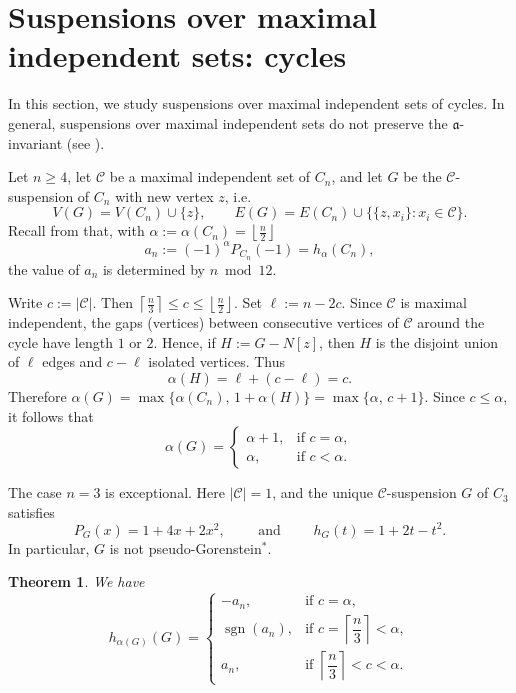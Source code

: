 \documentclass[12pt]{amsart}
\theoremstyle{plain}
\newtheorem{thm}{Theorem}[section]
\theoremstyle{definition}
\begin{document}
\section{Suspensions over maximal independent sets: cycles}

In this section, we study suspensions over maximal independent sets of cycles.
In general, suspensions over maximal independent sets do not preserve the
\(\mathfrak a\)-invariant (see \cite[Theorem 5.7]{Kara_Vien_2026}).

Let \(n\ge 4\), let \(\mathcal C\) be a maximal independent set of \(C_n\), and
let \(G\) be the \(\mathcal C\)-suspension of \(C_n\) with new vertex \(z\), i.e.
\[
V(G)=V(C_n)\cup\{z\},
\qquad
E(G)=E(C_n)\cup\{\{z,x_i\}:x_i\in \mathcal C\}.
\]
Recall from  that, with \(\alpha:=\alpha(C_n)=\left\lfloor \frac n2\right\rfloor\)
\[
a_n:=(-1)^{\alpha}P_{C_n}(-1)=h_{\alpha}(C_n),
\]
the value of \(a_n\) is determined by \(n \bmod 12\).

\begin{remark}\label{rem:cycle-max-ind}
Write \(c:=|\mathcal C|\). Then \(\left\lceil \frac n3\right\rceil \le c\le \left\lfloor \frac n2\right\rfloor\). Set \(\ell:=n-2c\). Since \(\mathcal C\) is maximal independent, the gaps (vertices) between
consecutive vertices of \(\mathcal C\) around the cycle have length \(1\) or \(2\).
Hence, if \(H:=G-N[z]\), then \(H\) is the disjoint union of \(\ell\) edges and \(c-\ell\) isolated vertices.
Thus
\[
\alpha(H)=\ell+(c-\ell)=c. 
\]
Therefore \(\alpha(G)=\max\{\alpha(C_n),\,1+\alpha(H)\}=\max\{\alpha,\,c+1\}\). Since \(c\le \alpha\), it follows that
\[
\alpha(G)=
\begin{cases}
\alpha+1,& \text{if } c=\alpha,\\[4pt]
\alpha,& \text{if } c<\alpha.
\end{cases}
\]
\end{remark}

\begin{remark}
The case \(n=3\) is exceptional. Here \(|\mathcal C|=1\), and the unique
\(\mathcal C\)-suspension \(G\) of \(C_3\) satisfies
\[
P_G(x)=1+4x+2x^2,
\qquad \text{ and } \qquad
h_G(t)=1+2t-t^2.
\]
In particular, \(G\) is not pseudo-Gorenstein\(^{*}\).
\end{remark}

\begin{thm}\label{thm:suspension_cycle}
We have
\[
h_{\alpha(G)}(G)=
\begin{cases}
-a_n,& \text{if } c=\alpha,\\[6pt]
\operatorname{sgn}(a_n),& \text{if } c=\left\lceil \dfrac n3\right\rceil<\alpha,\\[6pt]
a_n,& \text{if } \left\lceil \dfrac n3\right\rceil<c<\alpha.
\end{cases}
\]
\end{thm}
\end{document}
